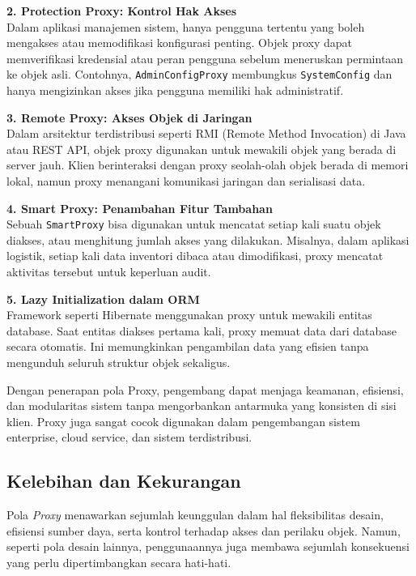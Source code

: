 \textbf{2. Protection Proxy: Kontrol Hak Akses} \\
Dalam aplikasi manajemen sistem, hanya pengguna tertentu yang boleh mengakses atau memodifikasi konfigurasi penting. Objek proxy dapat memverifikasi kredensial atau peran pengguna sebelum meneruskan permintaan ke objek asli. Contohnya, \texttt{AdminConfigProxy} membungkus \texttt{SystemConfig} dan hanya mengizinkan akses jika pengguna memiliki hak administratif.

\textbf{3. Remote Proxy: Akses Objek di Jaringan} \\
Dalam arsitektur terdistribusi seperti RMI (Remote Method Invocation) di Java atau REST API, objek proxy digunakan untuk mewakili objek yang berada di server jauh. Klien berinteraksi dengan proxy seolah-olah objek berada di memori lokal, namun proxy menangani komunikasi jaringan dan serialisasi data.

\textbf{4. Smart Proxy: Penambahan Fitur Tambahan} \\
Sebuah \texttt{SmartProxy} bisa digunakan untuk mencatat setiap kali suatu objek diakses, atau menghitung jumlah akses yang dilakukan. Misalnya, dalam aplikasi logistik, setiap kali data inventori dibaca atau dimodifikasi, proxy mencatat aktivitas tersebut untuk keperluan audit.

\textbf{5. Lazy Initialization dalam ORM} \\
Framework seperti Hibernate menggunakan proxy untuk mewakili entitas database. Saat entitas diakses pertama kali, proxy memuat data dari database secara otomatis. Ini memungkinkan pengambilan data yang efisien tanpa mengunduh seluruh struktur objek sekaligus.

Dengan penerapan pola Proxy, pengembang dapat menjaga keamanan, efisiensi, dan modularitas sistem tanpa mengorbankan antarmuka yang konsisten di sisi klien. Proxy juga sangat cocok digunakan dalam pengembangan sistem enterprise, cloud service, dan sistem terdistribusi.


\subsection{Kelebihan dan Kekurangan}

Pola \textit{Proxy} menawarkan sejumlah keunggulan dalam hal fleksibilitas desain, efisiensi sumber daya, serta kontrol terhadap akses dan perilaku objek. Namun, seperti pola desain lainnya, penggunaannya juga membawa sejumlah konsekuensi yang perlu dipertimbangkan secara hati-hati.

